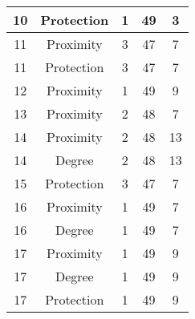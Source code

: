 \documentclass[results.tex]{subfiles}
\begin{document}
\begin{center}
\begin{tabular}{| c || c | c | c | c |}
            \hline
            10                      & Protection                   & 1                      & 49                      & 3                    \\
            \hline
            11                      & Proximity                    & 3                      & 47                      & 7                    \\
            \hline
            11                      & Protection                   & 3                      & 47                      & 7                    \\
            \hline
            12                      & Proximity                    & 1                      & 49                      & 9                    \\
            \hline
            13                      & Proximity                    & 2                      & 48                      & 7                    \\
            \hline
            14                      & Proximity                    & 2                      & 48                      & 13                   \\
            \hline
            14                      & Degree                       & 2                      & 48                      & 13                   \\
            \hline
            15                      & Protection                   & 3                      & 47                      & 7                    \\
            \hline
            16                      & Proximity                    & 1                      & 49                      & 7                    \\
            \hline
            16                      & Degree                       & 1                      & 49                      & 7                    \\
            \hline
            17                      & Proximity                    & 1                      & 49                      & 9                    \\
            \hline
            17                      & Degree                       & 1                      & 49                      & 9                    \\
            \hline
            17                      & Protection                   & 1                      & 49                      & 9                    \\

\end{tabular}
\end{center}
\end{document}
